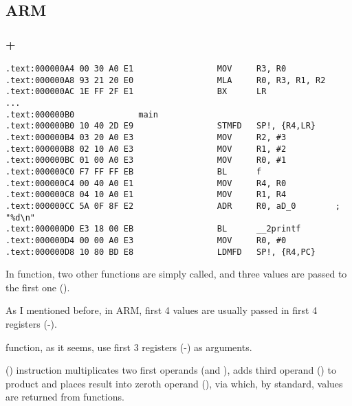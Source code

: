 \subsection{ARM}

\subsubsection{\NonOptimizingKeil + \ARMMode}

\begin{lstlisting}
.text:000000A4 00 30 A0 E1                 MOV     R3, R0
.text:000000A8 93 21 20 E0                 MLA     R0, R3, R1, R2
.text:000000AC 1E FF 2F E1                 BX      LR
...
.text:000000B0             main
.text:000000B0 10 40 2D E9                 STMFD   SP!, {R4,LR}
.text:000000B4 03 20 A0 E3                 MOV     R2, #3
.text:000000B8 02 10 A0 E3                 MOV     R1, #2
.text:000000BC 01 00 A0 E3                 MOV     R0, #1
.text:000000C0 F7 FF FF EB                 BL      f
.text:000000C4 00 40 A0 E1                 MOV     R4, R0
.text:000000C8 04 10 A0 E1                 MOV     R1, R4
.text:000000CC 5A 0F 8F E2                 ADR     R0, aD_0        ; "%d\n"
.text:000000D0 E3 18 00 EB                 BL      __2printf
.text:000000D4 00 00 A0 E3                 MOV     R0, #0
.text:000000D8 10 80 BD E8                 LDMFD   SP!, {R4,PC}
\end{lstlisting}

{In \main function, two other functions are simply called, and three values are passed to the 
first one ().}

{As I mentioned before, in ARM, first 4 values are usually passed in first 4 registers} (\Rzero-\Rthree).

{function, as it seems, use first 3 registers (\Rzero-\Rtwo) as arguments.}

 () 
{instruction multiplicates two first operands (\Rthree and \Rone), adds third operand (\Rtwo) to product and places
result into zeroth operand (\Rzero), via which, by standard, values are returned from functions.}

